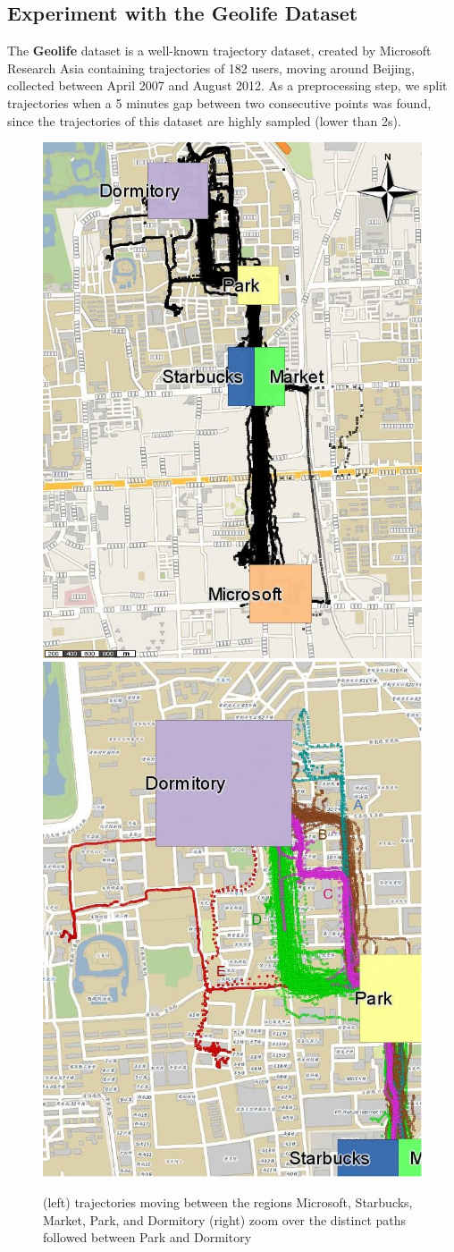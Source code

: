 \documentclass[12pt]{article}
\begin{document}
\subsection{Experiment with the Geolife Dataset}\label{sec:geolife}

The \textbf{Geolife} dataset is a well-known trajectory dataset, created by Microsoft Research Asia \cite{zheng2009mining} containing trajectories of 182 users, moving around Beijing, collected between April 2007 and August 2012. As a preprocessing step, we split trajectories when a 5 minutes gap between two consecutive points was found, since the trajectories of this dataset are highly sampled (lower than 2s).

\begin{figure}[ht!]
\centering
\centerline{
\includegraphics[width=.5\textwidth]{Images/Geolife-Trajectories-painted}
\includegraphics[width=.5\textwidth]{Images/Geolife-Paths-painted}
}
\caption{(left) trajectories moving between the regions Microsoft, Starbucks, Market, Park, and Dormitory (right) zoom over the distinct paths followed between Park and Dormitory}
\label{fig:geolife_map_rois}
\end{figure}
\end{document}

